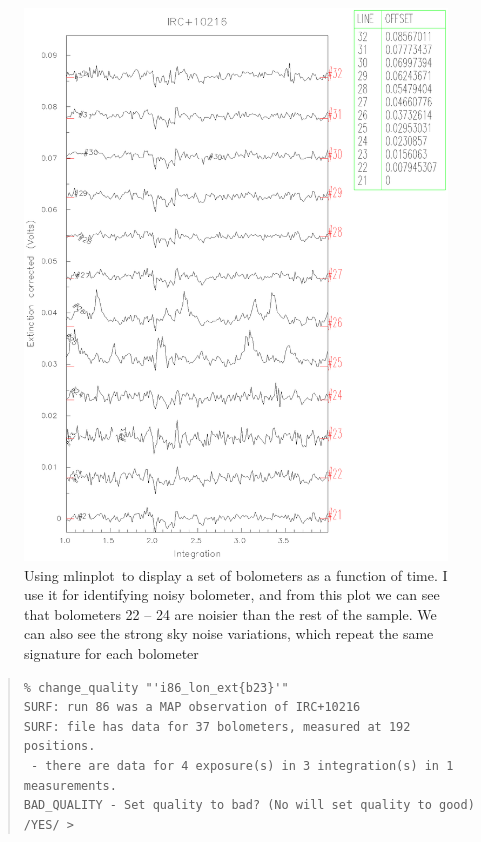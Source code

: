 \documentclass[twoside,11pt]{article}
\newenvironment{myquote}{\begin{quote}\begin{small}}{\end{small}\end{quote}}
\newcommand{\task}[1]{\textsf{#1}}
\newcommand{\mlinplot}{\xref{\task{mlinplot}}{sun95}{MLINPLOT}}
\newcommand{\xref}[3]{#1}
\renewcommand{\_}{\texttt{\symbol{95}}}
\begin{document}
\begin{figure}
\begin{center}
\includegraphics[width=5.8in]{sho_fig2.eps}
\caption{Using \mlinplot\ to display a set of bolometers as a function of time.
I use it for identifying noisy bolometer, and from this plot we can see that
bolometers 22 -- 24 are noisier than the rest of the sample. We can also see
the strong sky noise variations, which repeat the same signature for each bolometer}
\label{fig:mlin}
\end{center}
\end{figure}


\begin{myquote}
\begin{verbatim}
% change_quality "'i86_lon_ext{b23}'"
SURF: run 86 was a MAP observation of IRC+10216
SURF: file has data for 37 bolometers, measured at 192 positions.
 - there are data for 4 exposure(s) in 3 integration(s) in 1 measurements.
BAD_QUALITY - Set quality to bad? (No will set quality to good) /YES/ > 
\end{verbatim}
\end{myquote}
\end{document}
